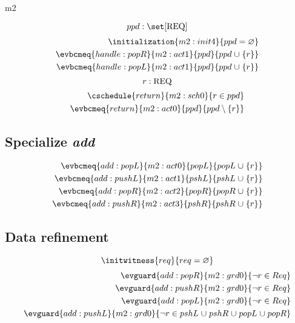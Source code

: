 \documentclass[12pt]{amsart}
\newcommand{\REQ}{\text{REQ}}
\begin{document}
\begin{machine}{m2}
\begin{align}
  \end{align}
  \[ \variable{ ppd : \set [\REQ] } \]
  \begin{align}
    \initialization{m2:init4}{ ppd = \emptyset } \\
    \evbcmeq{handle:popR}{m2:act1}{ppd}{ ppd \bunion \{r\} } \\
    \evbcmeq{handle:popL}{m2:act1}{ppd}{ ppd \bunion \{r\} }
  \end{align}
  \[ \indices{return}{ r : \REQ } \]
  \begin{align}
    \cschedule{return}{m2:sch0}{ r \in ppd } \\
    \evbcmeq{return}{m2:act0}{ppd}{ ppd \setminus \{ r \} }
  \end{align}
\subsection{Specialize \emph{add}}
  \begin{align}
    \evbcmeq{add:popL}{m2:act0}{popL}{popL \bunion \{r\}} \\
    \evbcmeq{add:pushL}{m2:act1}{pshL}{pshL \bunion \{r\}} \\
    \evbcmeq{add:popR}{m2:act2}{popR}{popR \bunion \{r\}} \\
    \evbcmeq{add:pushR}{m2:act3}{pshR}{pshR \bunion \{r\}} 
  \end{align}
\subsection{Data refinement}
  \[\initwitness{req}{req = \emptyset}\]
  \begin{align*}
  \evguard{add:popR}{m2:grd0}
    { \neg r \in Req } \\
  \evguard{add:pushR}{m2:grd0}
    { \neg r \in Req } \\
  \evguard{add:popL}{m2:grd0}
    { \neg r \in Req } \\
  \evguard{add:pushL}{m2:grd0}
    { \neg r \in pshL \bunion pshR \bunion popL \bunion popR } 
  \end{align*}
\end{machine}
  \newcommand{\OBJ}{\text{OBJ}}
\end{document}
